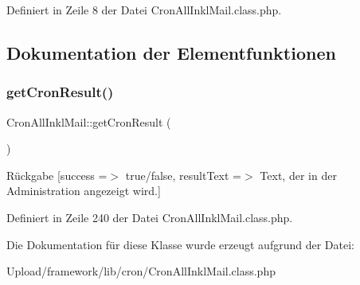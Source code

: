 Definiert in Zeile 8 der Datei Cron\+All\+Inkl\+Mail.\+class.\+php.



\subsection{Dokumentation der Elementfunktionen}
\mbox{\label{class_cron_all_inkl_mail_a4ce35ab45888b9bc2767313093424008}} 
\subsubsection{\texorpdfstring{get\+Cron\+Result()}{getCronResult()}}
{\footnotesize\ttfamily Cron\+All\+Inkl\+Mail\+::get\+Cron\+Result (\begin{DoxyParamCaption}{ }\end{DoxyParamCaption})}

\begin{DoxyReturn}{Rückgabe}
\mbox{[}\textquotesingle{}success\textquotesingle{} =$>$ \textquotesingle{}true/false\textquotesingle{}, \textquotesingle{}result\+Text\textquotesingle{} =$>$ \textquotesingle{}Text, der in der Administration angezeigt wird.\textquotesingle{}\mbox{]} 
\end{DoxyReturn}


Definiert in Zeile 240 der Datei Cron\+All\+Inkl\+Mail.\+class.\+php.



Die Dokumentation für diese Klasse wurde erzeugt aufgrund der Datei\+:\begin{DoxyCompactItemize}
\item 
Upload/framework/lib/cron/Cron\+All\+Inkl\+Mail.\+class.\+php\end{DoxyCompactItemize}
